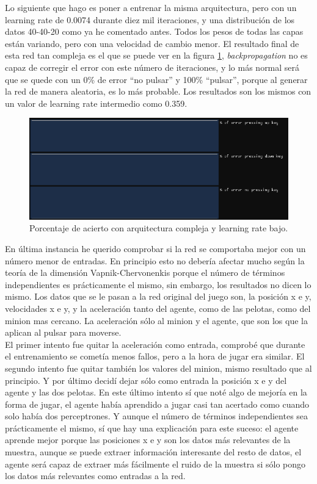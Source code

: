 Lo siguiente que hago es poner a entrenar la misma arquitectura, pero con un learning rate de 0.0074 durante diez mil iteraciones, y una distribución de los datos 40-40-20 como ya he comentado antes. Todos los pesos  de todas las capas están variando, pero con una velocidad de cambio menor. El resultado final de esta red tan compleja es el que se puede ver en la figura \ref{bajo learning rate arquitectura compleja}, \textit{backpropagation} no es capaz de corregir el error con este número de iteraciones, y lo más normal será que se quede con un 0\% de error ``no pulsar'' y 100\% ``pulsar'', porque al generar la red de manera aleatoria, es lo más probable. Los resultados son los mismos con un valor de learning rate intermedio como 0.359.
\begin{figure}[H]
	\centering
	\includegraphics[width=15cm]{archivos/imagenes/arquitectura-compleja-learning-rate-bajo.png}
	\caption{Porcentaje de acierto con arquitectura compleja y learning rate bajo.}
	\label{bajo learning rate arquitectura compleja}
\end{figure}

En última instancia he querido comprobar si la red se comportaba mejor con un número menor de entradas. En principio esto no debería afectar mucho según la teoría de la dimensión Vapnik-Chervonenkis porque el número de términos independientes es prácticamente el mismo, sin embargo, los resultados no dicen lo mismo. Los datos que se le pasan a la red original del juego son, la posición x e y, velocidades x e y, y la aceleración tanto del agente, como de las pelotas, como del minion mas cercano. La aceleración sólo al minion y el agente, que son los que la aplican al pulsar para moverse.
\\
El primer intento fue quitar la aceleración como entrada, comprobé que durante el entrenamiento se cometía menos fallos, pero a la hora de jugar era similar. El segundo intento fue quitar también los valores del minion, mismo resultado que al principio. Y por último decidí dejar sólo como entrada la posición x e y del agente y las dos pelotas. En este último intento sí que noté algo de mejoría en la forma de jugar, el agente había aprendido a jugar casi tan acertado como cuando solo había dos perceptrones. Y aunque el número de términos independientes sea prácticamente el mismo, sí que hay una explicación para este suceso: el agente aprende mejor porque las posiciones x e y son los datos más relevantes de la muestra, aunque se puede extraer información interesante del resto de datos, el agente será capaz de extraer más fácilmente el ruido de la muestra si sólo pongo los datos más relevantes como entradas a la red.